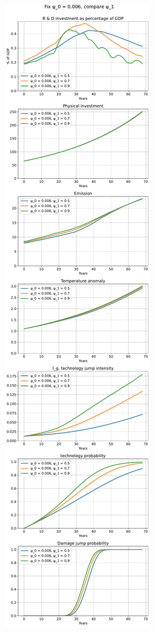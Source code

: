 \documentclass{article}
\begin{document}
	\begin{figure}
		\centering
		\includegraphics{../figures/psi_0_0.006.pdf}
	\end{figure}
\end{document}

